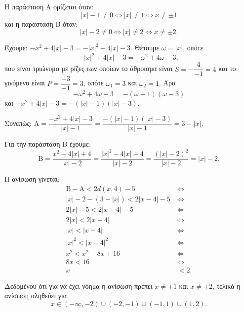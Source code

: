 
\begin{alist}
\item Η παράσταση Α ορίζεται όταν:
\[|x| - 1 \ne 0 \Leftrightarrow |x| \ne 1 \Leftrightarrow x \ne \pm 1\]
και η παράσταση Β όταν:
\[|x| - 2 \ne 0 \Leftrightarrow |x| \ne 2 \Leftrightarrow x \ne \pm 2.\]

\item Έχουμε: $-x^2 + 4|x| - 3 = -|x|^2 + 4|x| - 3$. Θέτουμε $\omega = |x|$, οπότε
\[-|x|^2 + 4|x| - 3 = -\omega^2 + 4\omega - 3,\]
που είναι τριώνυμο με ρίζες των οποίων το άθροισμα είναι $S = -\dfrac{4}{-1} = 4$ και το γινόμενο
είναι $P = \dfrac{-3}{-1} = 3$, οπότε $\omega_1 = 3$ και $\omega_2 = 1$. Άρα
\[-\omega^2 + 4\omega - 3 = -(\omega - 1)(\omega - 3)\]
και
$-x^2 + 4|x| - 3 = -(|x| - 1)(|x| - 3)$.

Συνεπώς: $\text{A} = \dfrac{-x^2 + 4|x| - 3}{|x| - 1} = \dfrac{-(|x| - 1)(|x| - 3)}{|x| - 1} = 3 - |x|$.

Για την παράσταση Β έχουμε:
\[\text{B} = \dfrac{x^2 - 4|x| + 4}{|x| - 2} = \dfrac{|x|^2 - 4|x| + 4}{|x| - 2} = \dfrac{(|x| - 2)^2}{|x| - 2} = |x| - 2.\]

\item Η ανίσωση γίνεται:
\begin{align*}
\text{B} - \text{A} < 2d(x, 4) - 5 \ &\Leftrightarrow \\
|x| - 2 - (3 - |x|) < 2|x - 4| - 5 \ &\Leftrightarrow \\
2|x| - 5 < 2|x - 4| - 5 \ &\Leftrightarrow \\
2|x| < 2|x - 4| \ &\Leftrightarrow \\
|x| < |x - 4| \ &\Leftrightarrow \\
|x|^2 < |x - 4|^2 \ &\Leftrightarrow \\
x^2 < x^2 - 8x + 16 \ &\Leftrightarrow \\
8x < 16 \ &\Leftrightarrow \\
x &< 2.
\end{align*}

Δεδομένου ότι για να έχει νόημα η ανίσωση πρέπει $x \ne \pm 1$ και $x \ne \pm 2$, τελικά η ανίσωση
αληθεύει για
\[x \in (-\infty, -2) \cup (-2, -1) \cup (-1, 1) \cup (1, 2).\]
\end{alist}

